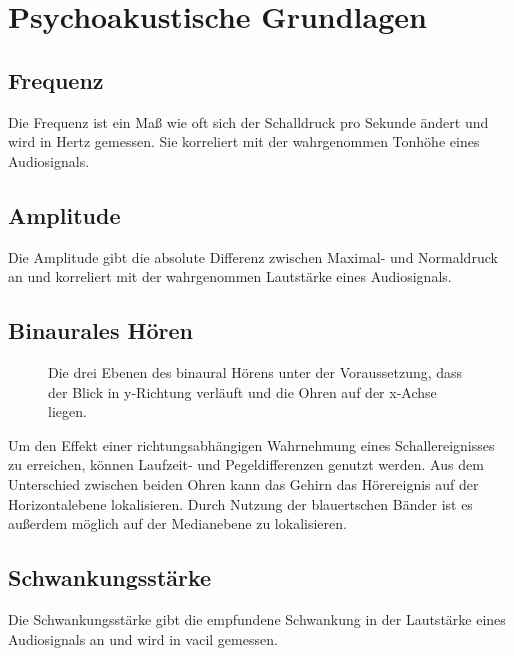 \documentclass[a4paper, 11pt]{scrartcl}
\begin{document}
\section{Psychoakustische Grundlagen}
\label{sec:psychoakustische_grundlagen}

\subsection{Frequenz}
\label{sub:frequenz}

Die Frequenz ist ein Maß wie oft sich der Schalldruck pro Sekunde ändert und
wird in Hertz gemessen. Sie korreliert mit der wahrgenommen Tonhöhe eines
Audiosignals.

\subsection{Amplitude}
\label{sub:Amplitude}

Die Amplitude gibt die absolute Differenz zwischen Maximal- und Normaldruck an
und korreliert mit der wahrgenommen Lautstärke eines Audiosignals.

\subsection{Binaurales Hören}
\label{sub:binaurales_hoeren}

\begin{figure}
\centering


\caption{Die drei Ebenen des binaural Hörens unter der Voraussetzung, dass der 
Blick in y-Richtung verläuft und die Ohren auf der x-Achse liegen.}

\label{fig:spatilisation}
\end{figure}

Um den Effekt einer richtungsabhängigen Wahrnehmung eines Schallereignisses zu
erreichen, können Laufzeit- und Pegeldifferenzen genutzt werden. Aus dem
Unterschied zwischen beiden Ohren kann das Gehirn das Hörereignis auf der
Horizontalebene lokalisieren. Durch Nutzung der blauertschen Bänder ist es
außerdem möglich auf der Medianebene zu lokalisieren.

\subsection{Schwankungsstärke}
\label{sub:schwankungsstaerke}

Die Schwankungsstärke gibt die empfundene Schwankung in der Lautstärke eines
Audiosignals an und wird in vacil gemessen.
\end{document}
